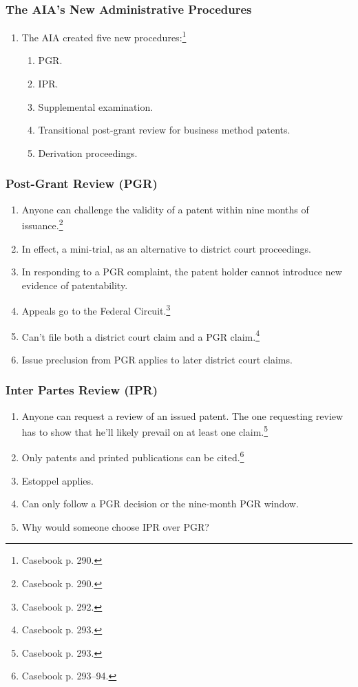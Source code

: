 \subsubsection{The AIA's New Administrative Procedures}

\begin{enumerate}
    \item The AIA created five new procedures:\footnote{Casebook p. 290.}
    \begin{enumerate}
        \item PGR.
        \item IPR.
        \item Supplemental examination.
        \item Transitional post-grant review for business method patents.
        \item Derivation proceedings.
    \end{enumerate}
\end{enumerate}

\subsubsection{Post-Grant Review (PGR)}

\begin{enumerate}
    \item Anyone can challenge the validity of a patent within nine months of 
    issuance.\footnote{Casebook p. 290.}
    \item In effect, a mini-trial, as an alternative to district court 
    proceedings.
    \item In responding to a PGR complaint, the patent holder cannot introduce 
    new evidence of patentability.
    \item Appeals go to the Federal Circuit.\footnote{Casebook p. 292.}
    \item Can't file both a district court claim and a PGR 
    claim.\footnote{Casebook p. 293.}
    \item Issue preclusion from PGR applies to later district court 
    claims.
\end{enumerate}

\subsubsection{Inter Partes Review (IPR)}

\begin{enumerate}
    \item Anyone can request a review of an issued patent. The one requesting 
    review has to show that he'll likely prevail on at least one 
    claim.\footnote{Casebook p. 293.}
    \item Only patents and printed publications can be cited.\footnote{Casebook 
    p. 293--94.}
    \item Estoppel applies.
    \item Can only follow a PGR decision or the nine-month PGR window.
    \item Why would someone choose IPR over PGR? %
\end{enumerate}


